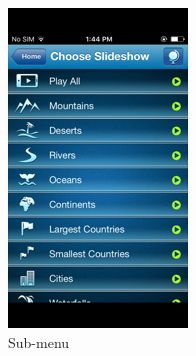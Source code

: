 \begin{figure}[!hbt]
 \begin{subfigure}{0.25\textwidth}
\includegraphics[width=\textwidth]{design4}
\caption{Sub-menu}
 \end{subfigure}\hspace{0.05\textwidth}
 \begin{subfigure}{0.25\textwidth}

\end{subfigure}
\end{figure}
